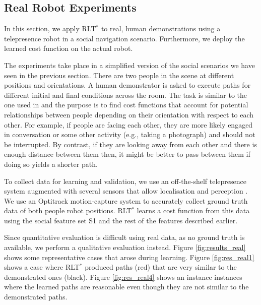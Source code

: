 \documentclass[letterpaper, 10 pt, conference]{ieeeconf}
\begin{document}
	\subsection{Real Robot Experiments}
	In this section, we apply RLT$^*$ to real, human demonstrations using a telepresence robot in a social navigation scenario. Furthermore, we deploy the learned cost function on the actual robot.

	The experiments take place in a simplified version of the social scenarios we have seen in the previous section. There are two people in the scene at different positions and orientations. A human demonstrator is asked to execute paths for different initial and final conditions across the room. The task is similar to the one used in \cite{okallearning} and the purpose is to find cost functions that account for potential relationships between people depending on their orientation with respect to each other. For example, if people are facing each other, they are more likely engaged in conversation or some other activity (e.g., taking a photograph) and should not be interrupted. By contrast, if they are looking away from each other and there is enough distance between them then, it might be better to pass between them if doing so yields a shorter path.

	To collect data for learning and validation, we use an off-the-shelf telepresence system augmented with several sensors that allow localisation and perception \cite{shiarlis2015teresa}. We use an Optitrack motion-capture system to accurately collect ground truth data of both people robot positions. RLT$^*$ learns a cost function from this data using the social feature set S1 and the rest of the features described earlier.

Since quantitative evaluation is difficult using real data, as no ground truth is available, we perform a qualitative evaluation instead. Figure \ref{fig:results_real} shows some representative cases that arose during learning. Figure \ref{fig:res_real1} shows a case where RLT$^*$ produced paths (red) that are very similar to the demonstrated ones (black). Figure \ref{fig:res_real4} shows an instance instances where  the learned paths are reasonable even though they are not similar to the demonstrated paths.
\end{document}
